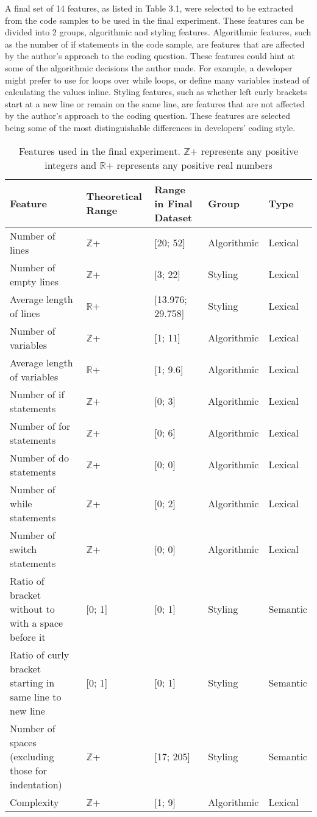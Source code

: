 \documentclass{report}
\begin{document}
A final set of 14 features, as listed in Table 3.1, were selected to be extracted from the code samples to be used in the final experiment. These features can be divided into 2 groups, algorithmic and styling features. Algorithmic features, such as the number of if statements in the code sample, are features that are affected by the author’s approach to the coding question. These features could hint at some of the algorithmic decisions the author made. For example, a developer might prefer to use for loops over while loops, or define many variables instead of calculating the values inline. Styling features, such as whether left curly brackets start at a new line or remain on the same line, are features that are not affected by the author’s approach to the coding question. These features are selected being some of the most distinguishable differences in developers’ coding style.

\begin{table}[h!]
\centering
\begin{tabular}{m{10em}m{5em}m{7em}ll}
\hline
Feature & Theoretical Range & Range in Final Dataset & Group & Type \\
\hline
Number of lines & $\mathbb{Z}$+ & [20; 52] & Algorithmic & Lexical \\
Number of empty lines & $\mathbb{Z}$+ & [3; 22] & Styling & Lexical \\
Average length of lines & $\mathbb{R}$+ & [13.976; 29.758] & Styling & Lexical \\
Number of variables & $\mathbb{Z}$+ & [1; 11] & Algorithmic & Lexical \\
Average length of variables & $\mathbb{R}$+ & [1; 9.6] & Algorithmic & Lexical \\
Number of if statements & $\mathbb{Z}$+ & [0; 3] & Algorithmic & Lexical \\
Number of for statements & $\mathbb{Z}$+ & [0; 6] & Algorithmic & Lexical \\
Number of do statements & $\mathbb{Z}$+ & [0; 0] & Algorithmic & Lexical \\
Number of while statements & $\mathbb{Z}$+ & [0; 2] & Algorithmic & Lexical \\
Number of switch statements & $\mathbb{Z}$+ & [0; 0] & Algorithmic & Lexical \\
Ratio of bracket without to with a space before it & [0; 1] & [0; 1] & Styling & Semantic \\
Ratio of curly bracket starting in same line to new line & [0; 1] & [0; 1] & Styling & Semantic \\
Number of spaces (excluding those for indentation) & $\mathbb{Z}$+ & [17; 205] & Styling & Semantic \\
Complexity & $\mathbb{Z}$+ & [1; 9] & Algorithmic & Lexical \\
\hline
\end{tabular}
\caption{Features used in the final experiment. $\mathbb{Z}$+ represents any positive integers and $\mathbb{R}$+ represents any positive real numbers}
\label{table:3.1}
\end{table}
\end{document}
